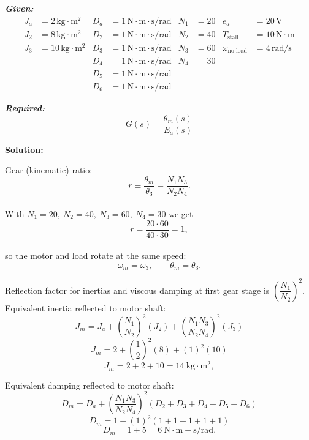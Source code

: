 \documentclass[11pt]{article}
\begin{document}
\vspace{12pt}

\noindent\textbf{\textit{Given:}}
\[
\begin{aligned}
J_a &= 2\, \text{kg}\cdot\text{m}^2 & D_a &= 1\, \text{N}\cdot\text{m}\cdot\text{s/rad} & N_1 &= 20 & e_a &= 20\,\text{V} \\
J_2 &= 8\, \text{kg}\cdot\text{m}^2 & D_2 &= 1\, \text{N}\cdot\text{m}\cdot\text{s/rad} & N_2 &= 40 & T_{\text{stall}} &= 10\,\text{N}\cdot\text{m} \\
J_3 &= 10\, \text{kg}\cdot\text{m}^2 & D_3 &= 1\, \text{N}\cdot\text{m}\cdot\text{s/rad} & N_3 &= 60 & \omega_{\text{no-load}} &= 4\,\text{rad/s} \\
& & D_4 &= 1\, \text{N}\cdot\text{m}\cdot\text{s/rad} & N_4 &= 30 & & \\
& & D_5 &= 1\, \text{N}\cdot\text{m}\cdot\text{s/rad} & & & & \\
& & D_6 &= 1\, \text{N}\cdot\text{m}\cdot\text{s/rad} & & & &
\end{aligned}
\]

\vspace{12pt}

\noindent \textbf{\textit{Required:}}
\[
G(s) = \frac{\theta_m(s)}{E_a(s)}
\]

\vspace{12pt}

\noindent \textbf{Solution:}

Gear (kinematic) ratio:
\[
r \equiv \frac{\theta_m}{\theta_3}=\frac{N_1 N_3}{N_2 N_4}.
\]  \\

With \(N_1=20,\ N_2=40,\ N_3=60,\ N_4=30\) we get
\[
r=\frac{20 \cdot 60}{40 \cdot 30}=1,
\] \\

so the motor and load rotate at the same speed:
\[
\omega_m = \omega_3,\qquad \theta_m = \theta_3.
\]

Reflection factor for inertias and viscous damping at first gear stage is \(\left(\dfrac{N_1}{N_2}\right)^2\). \\

Equivalent inertia reflected to motor shaft:
\[
J_m = J_a + \left(\frac{N_1}{N_2}\right)^2 (J_2) + \left(\frac{N_1 N_3}{N_2 N_4}\right)^2 (J_3)
\]
\[
J_m = 2 + \left(\frac{1}{2}\right)^2 (8) + (1)^2 (10)
\]
\[
J_m = 2 + 2 + 10 = 14\ \mathrm{kg\cdot m^2},
\]

Equivalent damping reflected to motor shaft:
\[
D_m = D_a + \left(\frac{N_1 N_3}{N_2 N_4}\right)^2 (D_2 + D_3 + D_4 + D_5 + D_6)
\]
\[
D_m = 1 + (1)^2 (1 + 1 + 1 + 1 + 1)
\]
\[
D_m = 1 + 5 = 6\ \mathrm{N\cdot m\!-\!s/rad}.
\]
\end{document}
